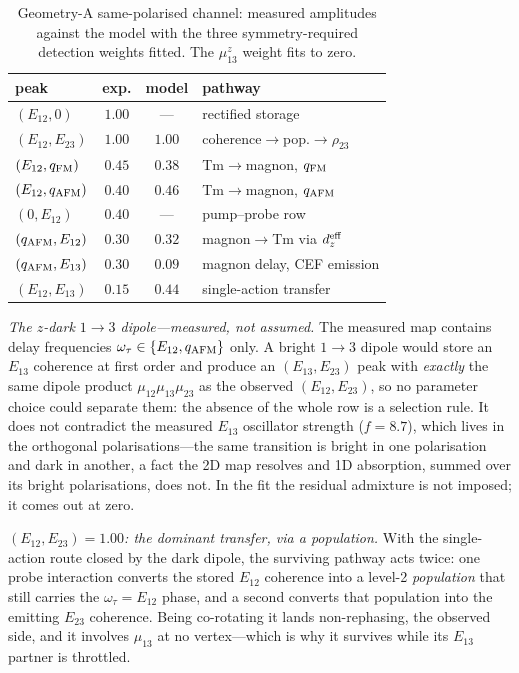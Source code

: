 \documentclass[aps,prb,twocolumn,superscriptaddress,longbibliography]{revtex4-2}
\newcommand{\qafm}{q_{\rm AFM}}
\newcommand{\qfm}{q_{\rm FM}}
\begin{document}
\begin{table}[b]
\caption{Geometry-A same-polarised channel: measured amplitudes against
the model with the three symmetry-required detection weights fitted.
The $\mu^z_{13}$ weight fits to zero.}
\label{tab:samepol}
\centering\small
\renewcommand{\arraystretch}{1.25}
\begin{tabular}{lccl}
\hline
peak & exp. & model & pathway\\
\hline
$(E_{12},0)$ & $1.00$ & --- & rectified storage\\
$(E_{12},E_{23})$ & $1.00$ & $1.00$ & coherence$\to$pop.$\to\rho_{23}$\\
$(E_{12},\qfm)$ & $0.45$ & $0.38$ & Tm$\to$magnon, $\qfm$\\
$(E_{12},\qafm)$ & $0.40$ & $0.46$ & Tm$\to$magnon, $\qafm$\\
$(0,E_{12})$ & $0.40$ & --- & pump--probe row\\
$(\qafm,E_{12})$ & $0.30$ & $0.32$ & magnon$\to$Tm via $d_z^{\rm eff}$\\
$(\qafm,E_{13})$ & $0.30$ & $0.09$ & magnon delay, CEF emission\\
$(E_{12},E_{13})$ & $0.15$ & $0.44$ & single-action transfer\\
\hline
\end{tabular}
\end{table}

\emph{The $z$-dark $1\to3$ dipole---measured, not assumed.}  The
measured map contains delay frequencies $\omega_\tau\in\{E_{12},\qafm\}$
only.  A bright $1\!\to\!3$ dipole would store an $E_{13}$ coherence at
first order and produce an $(E_{13},E_{23})$ peak with \emph{exactly}
the same dipole product $\mu_{12}\mu_{13}\mu_{23}$ as the observed
$(E_{12},E_{23})$, so no parameter choice could separate them: the
absence of the whole row is a selection rule.  It does not contradict
the measured $E_{13}$ oscillator strength ($f=8.7$), which lives in the
orthogonal polarisations---the same transition is bright in one
polarisation and dark in another, a fact the 2D map resolves and 1D
absorption, summed over its bright polarisations, does not.  In the fit
the residual admixture is not imposed; it comes out at zero.

\emph{$(E_{12},E_{23})=1.00$: the dominant transfer, via a population.}
With the single-action route closed by the dark dipole, the surviving
pathway acts twice: one probe interaction converts the stored $E_{12}$
coherence into a level-2 \emph{population} that still carries the
$\omega_\tau=E_{12}$ phase, and a second converts that population into
the emitting $E_{23}$ coherence.  Being co-rotating it lands
non-rephasing, the observed side, and it involves $\mu_{13}$ at no
vertex---which is why it survives while its $E_{13}$ partner is
throttled.
\end{document}
